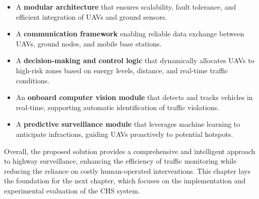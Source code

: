\begin{itemize}
    \item A \textbf{modular architecture} that ensures scalability, fault tolerance, and efficient integration of UAVs and ground sensors.
    \item A \textbf{communication framework} enabling reliable data exchange between UAVs, ground nodes, and mobile base stations.
    \item A \textbf{decision-making and control logic} that dynamically allocates UAVs to high-risk zones based on energy levels, distance, and real-time traffic conditions.
    \item An \textbf{onboard computer vision module} that detects and tracks vehicles in real-time, supporting automatic identification of traffic violations.
    \item A \textbf{predictive surveillance module} that leverages machine learning to anticipate infractions, guiding UAVs proactively to potential hotspots.
\end{itemize}

Overall, the proposed solution provides a comprehensive and intelligent approach to highway surveillance, enhancing the efficiency of traffic monitoring while reducing the reliance on costly human-operated interventions. This chapter lays the foundation for the next chapter, which focuses on the implementation and experimental evaluation of the CHS system.